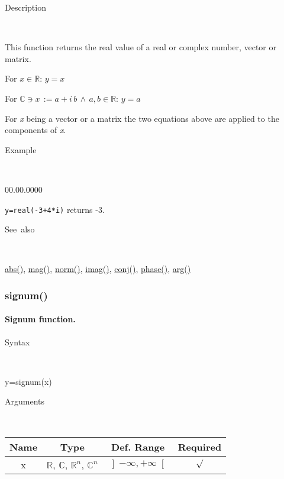 \begin{description}
\item [Description]~
\end{description}
This function returns the real value of a real or complex number,
vector or matrix.

\medskip{}
For $x\in\mathbb{R}$: $y=x$
\medskip{}

For $\mathbb{\mathbb{C}}\ni x\,:=a+i\, b\,\wedge\, a,b\in\mathbb{R}$:
$y=a$
\medskip{}

For \textit{x} being a vector or a matrix the two equations above
are applied to the components of \textit{x}.

\begin{description}
\item [Example]~
\end{description}
\begin{lyxlist}{00.00.0000}
\item [\texttt{y=real(-3+4{*}i)}]returns -3.
\end{lyxlist}
\begin{description}
\item [See~also]~
\end{description}
\textcolor{blue}{\hyperlink{abs}{abs()}}, \textcolor{blue}{\hyperlink{mag}{mag()}},
\textcolor{blue}{\hyperlink{norm}{norm()}}, \textcolor{blue}{\hyperlink{imag}{imag()}},
\textcolor{blue}{\hyperlink{conj}{conj()}}, \textcolor{blue}{\hyperlink{phase}{phase()}},
\textcolor{blue}{\hyperlink{arg}{arg()}}


\newpage
\subsubsection*{\hypertarget{signum}{}{\Large signum()}}


\paragraph{\label{par:Signum}Signum function.}

\begin{description}
\item [Syntax]~
\end{description}
y=signum(x)

\begin{description}
\item [Arguments]~
\end{description}
\begin{tabular}{|c|c|c|c|}
\hline 
Name&
Type&
Def. Range&
Required\tabularnewline
\hline
\hline 
x&
$\mathbb{R}$, $\mathbb{C}$, $\mathbb{R}^{n}$, $\mathbb{C}^{n}$&
$\left]-\infty,+\infty\right[$&
$\surd$\tabularnewline
\hline
\end{tabular}

